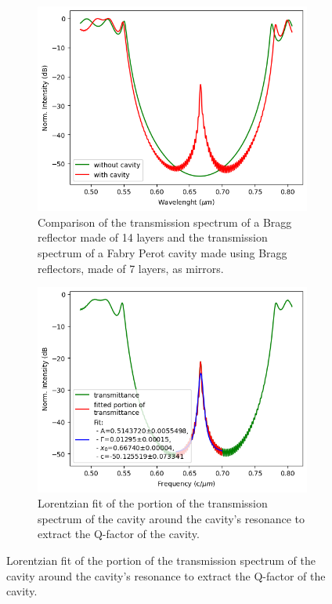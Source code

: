 \begin{figure}[H]
    \centering
    \begin{subfigure}[b]{0.45\linewidth}
        \centering
        \includegraphics[width=\linewidth]{Figures/bragg_vs_cavity_spectrum.png}
        \caption{Comparison of the transmission spectrum of a Bragg reflector made of 14 layers and the transmission spectrum of a Fabry Perot cavity made using Bragg reflectors, made of 7 layers, as mirrors.}
        \label{fig:bragg_vs_cavity_spectrum}
    \end{subfigure}
    \hfill
    \begin{subfigure}[b]{0.45\linewidth}
        \centering
        \includegraphics[width=\linewidth]{Figures/bragg_cavity_spectrum_fit.png}
        \caption{Lorentzian fit of the portion of the transmission spectrum of the cavity around the cavity's resonance to extract the Q-factor of the cavity.}
        \label{fig:bragg_cavity_spectrum_fit}
    \end{subfigure}
\end{figure}

